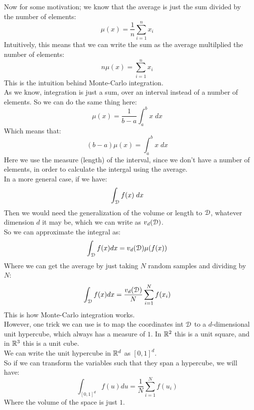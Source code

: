 \documentclass[12pt]{article}
\begin{document}
Now for some motivation;
we know that the average is just the
sum divided by the number of elements:
\[ \mu(x) = \dfrac{1}{n}\sum_{i=1}^n x_i \]
Intuitively, this means that we can write
the sum as the average multilplied the number
of elements:
\[ n\mu(x) = \sum_{i=1}^n x_i \]
This is the intuition behind Monte-Carlo
integration. \\

As we know, integration is just a sum,
over an interval instead of a number of elements.
So we can do the same thing here:
\[ \mu(x) = \dfrac{1}{b-a}\int_a^b x \; dx \]
Which means that:
\[ (b-a)\mu(x) = \int_a^b x \; dx \]
Here we use the measure (length)
of the interval, since we don't have a number
of elements, in order to calculate the intergal
using the average. \\

In a more general case, if we have:
\[ \int_{\mathcal{D}} f(x) \; dx \]
Then we would need the generalization
of the volume or length to $\mathcal{D}$,
whatever dimension $d$ it may be,
which we can write as $v_d(\mathcal{D})$. \\
So we can approximate the integral as:
\[ \int_{\mathcal{D}} f(x) dx
= v_d(\mathcal{D})\mu(f(x)) \]
Where we can get the average by just taking
$N$ random samples and dividing by $N$:
\[ \int_{\mathcal{D}} f(x) dx
= \dfrac{v_d(\mathcal{D})}{N} \sum_{i=1}^N f(x_i) \]
This is how Monte-Carlo integration works. \\

However, one trick we can use
is to map the coordinates int $\mathcal{D}$
to a $d$-dimensional unit hypercube,
which always has a measure of $1$.
In $\mathbb{R}^2$ this is a unit square,
and in $\mathbb{R}^3$ this is a unit cube. \\
We can write the unit hypercube in $\mathbb{R}^d$ 
as $[0, 1]^d$. \\
So if we can transform the variables
such that they span a hypercube,
we will have:
\[ \int_{[0, 1]^d} f(u) du
= \dfrac{1}{N} \sum_{i=1}^N f(u_i)  \]
Where the volume of the space is just $1$. \\
\end{document}
